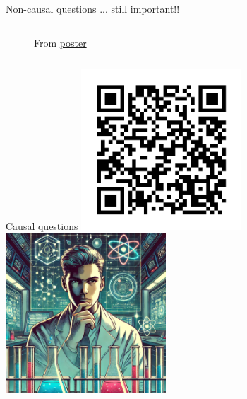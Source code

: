 \documentclass{beamer}
\begin{document}
\begin{frame}{Non-causal questions ... still important!!}
\begin{columns}
\begin{column}{0.5\textwidth}
{\begin{figure}
	  \caption{From \cite{aybar2024onboard} \href{https://events.ecmwf.int/event/304/contributions/3629/attachments/2126/3769/ECMWF-ESA-WS_Garicia-Acciarini.pdf}{poster}} 
	\end{figure}
      }
    \end{column}
  \end{columns}

\end{frame}


\begin{frame}{Causal questions}
  \includegraphics[width=0.45\textwidth]{QR0}
  \includegraphics[width=0.45\textwidth]{scientistthink}
\end{frame}
\end{document}
